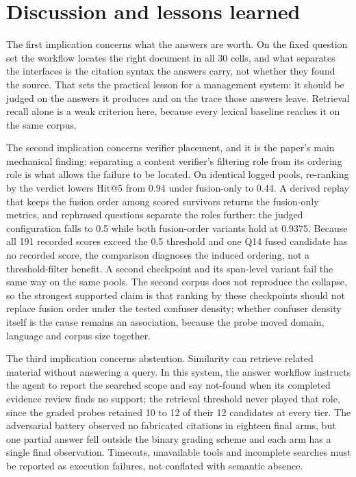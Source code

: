 \section{Discussion and lessons learned}
\label{sec:discussion}

The first implication concerns what the answers are worth. On the fixed
question set the workflow locates the right document in all 30 cells, and what
separates the interfaces is the citation syntax the answers carry, not whether
they found the source. That sets the practical lesson for a management system:
it should be judged on the answers it produces and on the trace those answers
leave. Retrieval recall alone is a weak criterion here, because every lexical
baseline reaches it on the same corpus.

The second implication concerns verifier placement, and it is the paper's main
mechanical finding: separating a content verifier's filtering role from its
ordering role is what allows the failure to be located. On identical logged
pools, re-ranking by the verdict lowers Hit@5 from 0.94 under fusion-only to
0.44. A derived replay that keeps the fusion order among scored survivors
returns the fusion-only metrics, and rephrased questions separate the roles
further: the judged configuration falls to 0.5 while both fusion-order
variants hold at 0.9375. Because all 191 recorded scores exceed the 0.5
threshold and one Q14 fused candidate has no recorded score, the comparison
diagnoses the induced ordering, not a threshold-filter benefit. A second
checkpoint and its span-level variant fail the same way on the same pools. The
second corpus does not reproduce the collapse, so the strongest supported
claim is that ranking by these checkpoints should not replace fusion order
under the tested confuser density; whether confuser density itself is the
cause remains an association, because the probe moved domain, language and
corpus size together.

The third implication concerns abstention. Similarity can retrieve related
material without answering a query. In this system, the answer workflow
instructs the agent to report the searched scope and say not-found when its
completed evidence review finds no support; the retrieval threshold never
played that role, since the graded probes retained 10 to 12 of their 12
candidates at every tier. The adversarial battery observed no fabricated
citations in eighteen final arms, but one partial answer fell outside the
binary grading scheme and each arm has a single final observation. Timeouts,
unavailable tools and incomplete searches must be reported as execution
failures, not conflated with semantic absence.

